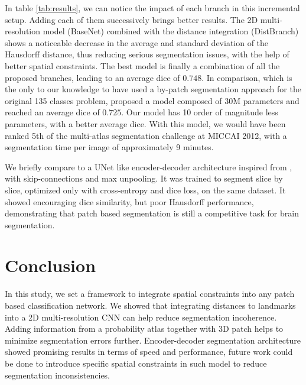 \documentclass{article}
\begin{document}
In table \ref{tab:results}, we can notice the impact of each branch in this incremental setup. Adding each of them successively brings better results.
The 2D multi-resolution model (BaseNet) combined with the distance integration (DistBranch) shows a noticeable decrease in the average and standard deviation of the Hausdorff distance, thus reducing serious segmentation issues, with the help of better spatial constraints. The best model is finally a combination of all the proposed branches, leading to an average dice of $0.748$. In comparison, \cite{brebisson} which is the only to our knowledge to have used a by-patch segmentation approach for the original 135 classes problem, proposed a model composed of 30M parameters and reached an average dice of $0.725$. Our model has 10 order of magnitude less parameters, with a better average dice. With this model, we would have been ranked 5th of the multi-atlas segmentation challenge at MICCAI 2012, with a segmentation time per image of approximately 9 minutes.

We briefly compare to a UNet \cite{unet} like encoder-decoder architecture inspired from \cite{DBLP:journals/corr/RoyCSKNW17}, with skip-connections and max unpooling. It was trained to segment slice by slice, optimized only with cross-entropy and dice loss, on the same dataset. It showed encouraging dice similarity, but poor Hausdorff performance, demonstrating that patch based segmentation is still a competitive task for brain segmentation.

\section{Conclusion}
In this study, we set a framework to integrate spatial constraints into any patch based classification network. We showed that integrating distances to landmarks into a 2D multi-resolution CNN can help reduce segmentation incoherence. Adding information from a probability atlas together with 3D patch helps to minimize segmentation errors further. \newline
Encoder-decoder segmentation architecture showed promising results in terms of speed and performance, future work could be done to introduce specific spatial constraints in such model to reduce segmentation inconsistencies.
\end{document}
